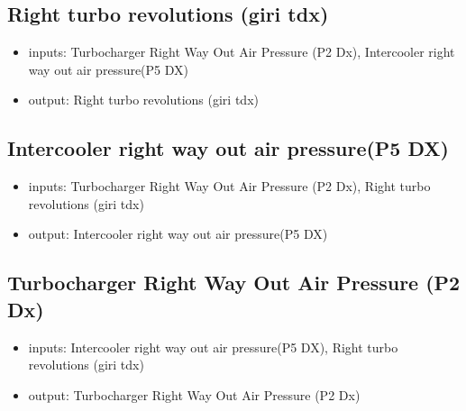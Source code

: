 


\subsection{Right turbo revolutions (giri tdx)}
\begin{itemize}
	\item{inputs: Turbocharger Right Way Out Air Pressure (P2 Dx), Intercooler right way out air pressure(P5 DX)}
	\item{output: Right turbo revolutions (giri tdx)}
\end{itemize}	




\subsection{Intercooler right way out air pressure(P5 DX)}
\begin{itemize}
	\item{inputs: Turbocharger Right Way Out Air Pressure (P2 Dx), Right turbo revolutions (giri tdx)}
	\item{output: Intercooler right way out air pressure(P5 DX)}
\end{itemize}	



\subsection{Turbocharger Right Way Out Air Pressure (P2 Dx)}
\begin{itemize}
	\item{inputs: Intercooler right way out air pressure(P5 DX), Right turbo revolutions (giri tdx)}
	\item{output: Turbocharger Right Way Out Air Pressure (P2 Dx)}
\end{itemize}	










